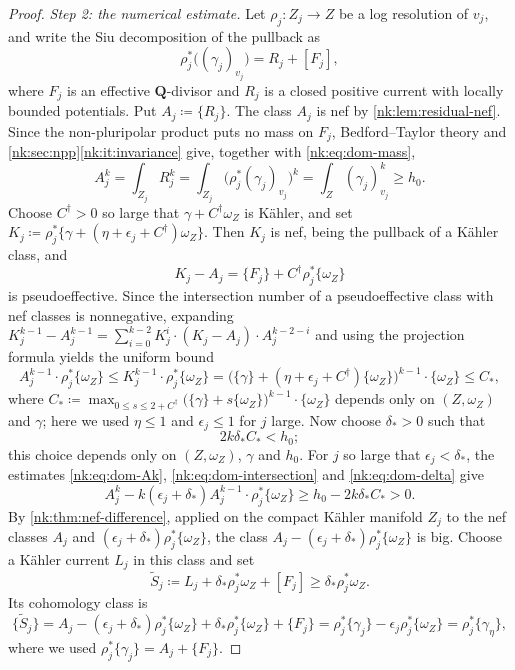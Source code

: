 \begin{proof}
\emph{Step 2: the numerical estimate.}
Let $\rho_j\colon Z_j\to Z$ be a log resolution of $v_j$, and write
the Siu decomposition of the pullback as
\[
  \rho_j^*\bigl((\gamma_j)_{v_j}\bigr)=R_j+[F_j],
\]
where $F_j$ is an effective $\mathbf Q$-divisor and $R_j$ is a closed
positive current with locally bounded potentials. Put $A_j\coloneqq \{R_j\}$.
The class $A_j$ is nef by \cref{nk:lem:residual-nef}. Since the
non-pluripolar product puts no mass on $F_j$, Bedford--Taylor theory and
\cref{nk:sec:npp}\ref{nk:it:invariance} give, together with
\eqref{nk:eq:dom-mass},
\begin{equation}\label{nk:eq:dom-Ak}
  A_j^k=\int_{Z_j}R_j^k
  =\int_{Z_j}\bigl(\rho_j^*(\gamma_j)_{v_j}\bigr)^k
  =\int_Z(\gamma_j)_{v_j}^k\ge h_0.
\end{equation}
Choose $C^\dagger>0$ so large that $\gamma+C^\dagger\omega_Z$ is
K\"ahler, and set
$K_j\coloneqq \rho_j^*\{\gamma+(\eta+\epsilon_j+C^\dagger)\omega_Z\}$. Then
$K_j$ is nef, being the pullback of a K\"ahler class, and
\[
  K_j-A_j=\{F_j\}+C^\dagger\rho_j^*\{\omega_Z\}
\]
is pseudoeffective. Since the intersection number of a pseudoeffective
class with nef classes is nonnegative, expanding
$K_j^{k-1}-A_j^{k-1}=\sum_{i=0}^{k-2}K_j^i\cdot(K_j-A_j)\cdot A_j^{k-2-i}$
and using the projection formula yields the uniform bound
\begin{equation}\label{nk:eq:dom-intersection}
  A_j^{k-1}\cdot\rho_j^*\{\omega_Z\}
  \le K_j^{k-1}\cdot\rho_j^*\{\omega_Z\}
  =\bigl(\{\gamma\}+(\eta+\epsilon_j+C^\dagger)\{\omega_Z\}\bigr)^{k-1}
   \cdot\{\omega_Z\}
  \le C_*,
\end{equation}
where
$C_*\coloneqq \max_{0\le s\le 2+C^\dagger}\bigl(\{\gamma\}+s\{\omega_Z\}\bigr)^{k-1}\cdot\{\omega_Z\}$
depends only on $(Z,\omega_Z)$ and $\gamma$; here we used
$\eta\le1$ and $\epsilon_j\le1$ for $j$ large. Now choose
$\delta_*>0$ such that
\begin{equation}\label{nk:eq:dom-delta}
  2k\delta_*C_*<h_0;
\end{equation}
this choice depends only on $(Z,\omega_Z)$, $\gamma$ and $h_0$. For
$j$ so large that $\epsilon_j<\delta_*$, the estimates
\eqref{nk:eq:dom-Ak}, \eqref{nk:eq:dom-intersection} and \eqref{nk:eq:dom-delta}
give
\[
  A_j^k-k(\epsilon_j+\delta_*)A_j^{k-1}\cdot\rho_j^*\{\omega_Z\}
  \ge h_0-2k\delta_*C_*>0.
\]
By \cref{nk:thm:nef-difference}, applied on the compact K\"ahler manifold
$Z_j$ to the nef classes $A_j$ and
$(\epsilon_j+\delta_*)\rho_j^*\{\omega_Z\}$, the class
$A_j-(\epsilon_j+\delta_*)\rho_j^*\{\omega_Z\}$
is big. Choose a K\"ahler current $L_j$ in this class and set
\[
  \widetilde S_j\coloneqq L_j+\delta_*\rho_j^*\omega_Z+[F_j]
  \ge\delta_*\rho_j^*\omega_Z .
\]
Its cohomology class is
\[
  \{\widetilde S_j\}
  =A_j-(\epsilon_j+\delta_*)\rho_j^*\{\omega_Z\}
     +\delta_*\rho_j^*\{\omega_Z\}+\{F_j\}
  =\rho_j^*\{\gamma_j\}-\epsilon_j\rho_j^*\{\omega_Z\}
  =\rho_j^*\{\gamma_\eta\},
\]
where we used $\rho_j^*\{\gamma_j\}=A_j+\{F_j\}$.


\end{proof}
